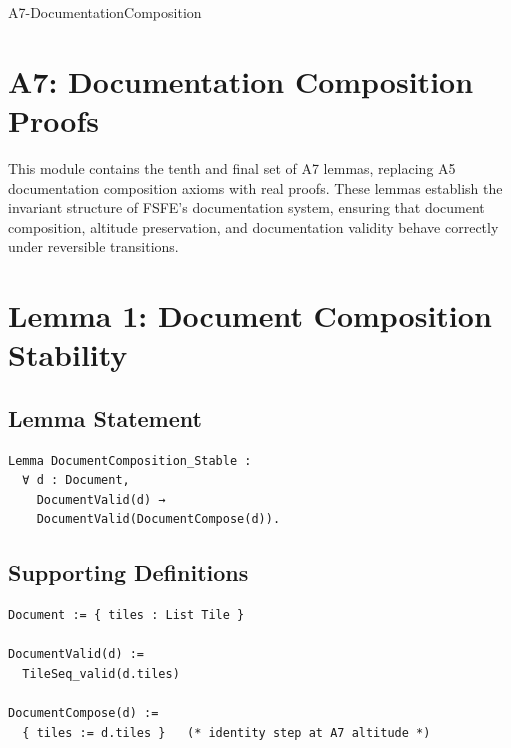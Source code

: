 \documentclass[11pt]{article}
\begin{document}


\begin{citationmembrane}{A7-DocumentationComposition}
\end{citationmembrane}

\section*{A7: Documentation Composition Proofs}

This module contains the tenth and final set of A7 lemmas, replacing A5
documentation composition axioms with real proofs. These lemmas establish the
invariant structure of FSFE’s documentation system, ensuring that document
composition, altitude preservation, and documentation validity behave correctly
under reversible transitions.

\newpage


\section{Lemma 1: Document Composition Stability}

\subsection{Lemma Statement}

\begin{verbatim}
Lemma DocumentComposition_Stable :
  ∀ d : Document,
    DocumentValid(d) →
    DocumentValid(DocumentCompose(d)).
\end{verbatim}

\subsection{Supporting Definitions}

\begin{verbatim}
Document := { tiles : List Tile }

DocumentValid(d) :=
  TileSeq_valid(d.tiles)

DocumentCompose(d) :=
  { tiles := d.tiles }   (* identity step at A7 altitude *)
\end{verbatim}
\end{document}
